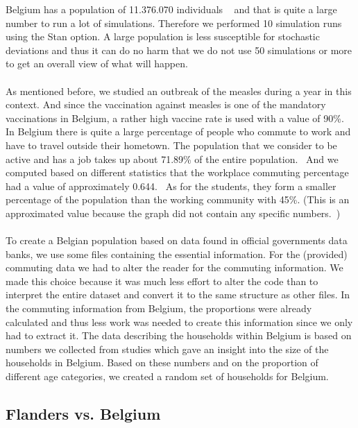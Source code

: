 \documentclass[runningheads]{llncs}
\begin{document}
	Belgium has a population of 11.376.070 individuals ~\cite{8} and that is quite a large number to run a lot of simulations. Therefore we performed 10 simulation runs using the Stan option. A large population is less susceptible for stochastic deviations and thus it can do no harm that we do not use 50 simulations or more to get an overall view of what will happen.\\
	\noindent\\
	As mentioned before, we studied an outbreak of the measles during a year in this context. And since the vaccination against measles is one of the mandatory vaccinations in Belgium, a rather high vaccine rate is used with a value of 90\%. ~\cite{9} In Belgium there is quite a large percentage of people who commute to work and have to travel outside their hometown. The population that we consider to be active and has a job takes up about 71.89\% of the entire population.~\cite{14} And we computed based on different statistics that the workplace commuting percentage had a value of approximately 0.644.~\cite{12} As for the students, they form a smaller percentage of the population than the working community with 45\%. (This is an approximated value because the graph did not contain any specific numbers.~\cite{15})\\
	\noindent\\
	To create a Belgian population based on data found in official governments data banks, we use some files containing the essential information. For the (provided) commuting data we had to alter the reader for the commuting information. We made this choice because it was much less effort to alter the code than to interpret the entire dataset and convert it to the same structure as other files. In the commuting information from Belgium, the proportions were already calculated and thus less work was needed to create this information since we only had to extract it. The data describing the households within Belgium is based on numbers we collected from studies which gave an insight into the size of the households in Belgium. Based on these numbers and on the proportion of different age categories, we created a random set of households for Belgium.~\cite{10} ~\cite{11}
	
	\subsection{Flanders vs. Belgium}
	
\end{document}
